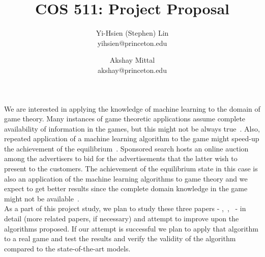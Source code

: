 \documentclass[12pt]{article}
\begin{document}
\title{COS 511: Project Proposal}
\author{
  Yi-Hsien (Stephen) Lin\\ yihsien@princeton.edu
  \and
  Akshay Mittal \\ akshay@princeton.edu
}
\date{}

\maketitle

\noindent We are interested in applying the knowledge of machine learning to
the domain of
 game theory. Many instances of game theoretic applications assume complete
 availability of information in the games, but this might not be always
 true~\cite{Blum:2006}. Also, repeated application of a machine learning
 algorithm to the game might speed-up the achievement of the
 equilibrium~\cite{Freund:1996}. Sponsored search
 hosts an online auction among the advertisers to bid for the advertisements
 that the latter wish to present to the customers. The achievement of the
 equilibrium state in this case is also an application of the machine learning
 algorithms to game theory and we expect to get better results since the
complete domain knowledge in the game might not be available~\cite{He:2013}.\\

\noindent As a part of this project study, we plan to study these three papers -
\cite{Freund:1996},~\cite{Blum:2006},~\cite{He:2013} - in detail (more related
 papers, if necessary) and attempt to improve upon the algorithms proposed. If
 our attempt is successful we plan to apply that algorithm to a real game and
 test the results and verify the validity of the algorithm compared to the
 state-of-the-art models.


{\footnotesize


}
\end{document}
